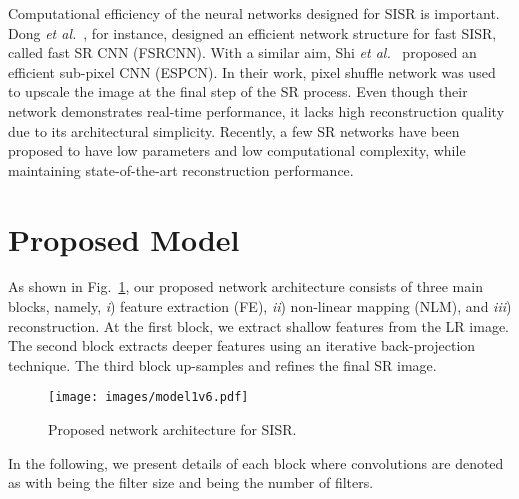 \documentclass[a4paper,11pt]{article}
\begin{document}
Computational efficiency of the neural networks designed for SISR is important. Dong \textit{et al.}~\cite{FSRCNN}, for instance, designed an efficient network structure for fast SISR, called fast SR CNN (FSRCNN). With a similar aim, Shi \textit{et al.}~\cite{ESPCN} proposed an efficient sub-pixel CNN (ESPCN). In their work, pixel shuffle network was used to upscale the image at the final step of the SR process. Even though their network demonstrates real-time performance, it lacks high reconstruction quality due to its architectural simplicity. Recently, a few SR networks \cite{CARN,IDN,FLSR} have been proposed to have low parameters and low computational complexity, while maintaining state-of-the-art reconstruction performance.  

































 \section{Proposed Model}
\label{model}




As shown in Fig.~\ref{fig:network}, our proposed network  architecture consists of three main blocks, namely, \textit{i}) feature extraction (FE), \textit{ii}) non-linear mapping (NLM), and \textit{iii}) reconstruction. At the first block, we extract shallow features from the LR image. The second block extracts deeper features using an iterative back-projection technique. The third block up-samples and refines the final SR image.
\begin{figure}[t]
    \centering
    \texttt{[image: images/model1v6.pdf]}
\caption{Proposed network architecture for SISR.}

    \label{fig:network}
\end{figure}
In the following, we present details of each block where convolutions are denoted as  with  being the filter size and  being the number of filters. 
\end{document}
